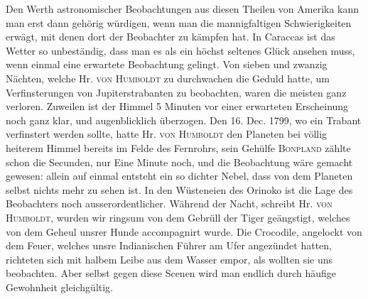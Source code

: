 Den Werth astronomischer Beobachtungen aus diesen Theilen von Amerika kann man erst dann gehörig würdigen, wenn man die mannigfaltigen Schwierigkeiten erwägt, mit denen dort der Beobachter zu kämpfen hat. In Caraccas ist das Wetter so unbeständig, dass man es als ein höchst seltenes Glück ansehen muss, wenn einmal eine erwartete Beobachtung gelingt. Von sieben und zwanzig Nächten, welche Hr. \textsc{von Humboldt} zu durchwachen die Geduld hatte, um Verfinsterungen von Jupiterstrabanten zu beobachten, waren die meisten ganz verloren. Zuweilen ist der Himmel 5 Minuten vor einer erwarteten Erscheinung noch ganz klar, und augenblicklich überzogen. Den 16. Dec. 1799, wo ein Trabant verfinstert werden sollte, hatte Hr. \textsc{von Humboldt} den Planeten bei völlig heiterem Himmel bereits im Felde des Fernrohrs, sein Gehülfe \textsc{Bonpland} zählte schon die Secunden, nur Eine Minute noch, und die Beobachtung wäre gemacht gewesen: allein auf einmal entsteht ein so dichter Nebel, dass von dem Planeten selbst nichts mehr zu sehen ist. In den Wüsteneien des Orinoko ist die Lage des Beobachters noch ausserordentlicher. Während der Nacht, schreibt Hr. \textsc{von Humboldt}, wurden wir ringsum von dem Gebrüll der Tiger geängstigt, welches von dem Geheul unsrer Hunde accompagnirt wurde. Die Crocodile, angelockt von dem Feuer, welches unsre Indianischen Führer am Ufer angezündet hatten, richteten sich mit halbem Leibe aus dem Wasser empor, als wollten sie uns beobachten. Aber selbst gegen diese Scenen wird man endlich durch häufige Gewohnheit gleichgültig.

